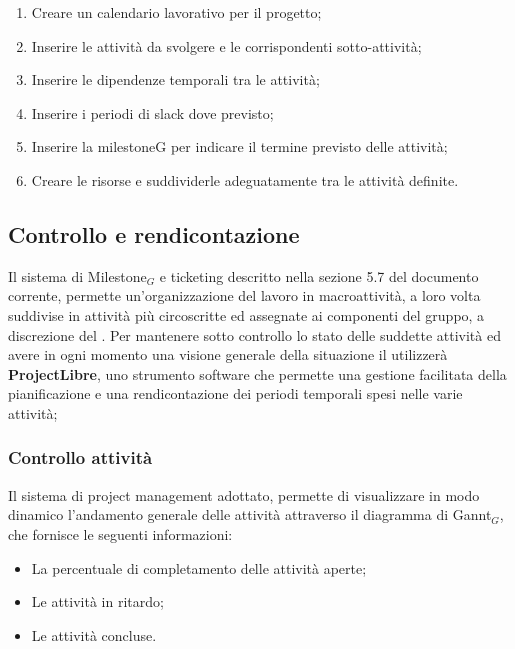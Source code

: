 \begin{enumerate}
	\item Creare un calendario lavorativo per il progetto;
	\item Inserire le attività da svolgere e le corrispondenti sotto-attività;
	\item Inserire le dipendenze temporali tra le attività;
	\item Inserire i periodi di slack dove previsto;
	\item Inserire la milestoneG per indicare il termine previsto delle attività;
	\item Creare le risorse e suddividerle adeguatamente tra le attività definite.
\end{enumerate}

\subsection{Controllo e rendicontazione}
Il sistema di Milestone$_G$ e ticketing descritto nella sezione 5.7 del documento corrente, permette un'organizzazione del lavoro in macroattività, a loro volta suddivise in attività più circoscritte ed assegnate ai componenti del gruppo, a discrezione del \ruoloResponsabile.
Per mantenere sotto controllo lo stato delle suddette attività ed avere in ogni momento una visione generale della situazione il \ruoloResponsabile{} utilizzerà \textbf{ProjectLibre}, uno strumento software che permette una gestione facilitata della pianificazione e una rendicontazione dei periodi temporali spesi nelle varie attività;

\subsubsection{Controllo attività}
Il sistema di project management adottato, permette di visualizzare in modo dinamico l'andamento generale delle attività attraverso il diagramma di Gannt$_G$, che fornisce le seguenti informazioni:
\begin{itemize}
\item La percentuale di completamento delle attività aperte;
\item Le attività in ritardo;
\item Le attività concluse.
\end{itemize}

